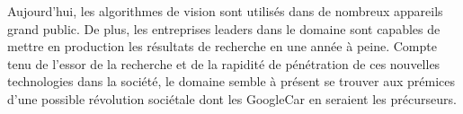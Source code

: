 \documentclass{article}
\begin{document}
Aujourd'hui, les algorithmes de vision sont utilisés dans de nombreux appareils grand public. De plus, les entreprises leaders dans le domaine sont capables de mettre en production les résultats de recherche en une année à peine.
Compte tenu de l'essor de la recherche et de la rapidité de pénétration de ces nouvelles technologies dans la société, le domaine semble à présent se trouver aux prémices d'une possible révolution sociétale dont les GoogleCar en seraient les précurseurs.


\nocite{Karpathy}

\nocite{karpathy2014deep}

\nocite{Gavves}

\nocite{ICML}

\nocite{Hays}

\nocite{Huang}

\nocite{Hoiem}

\nocite{Tesla}

\nocite{jaderberg2015}

%
%
\printbibliography

\newpage
\end{document}
